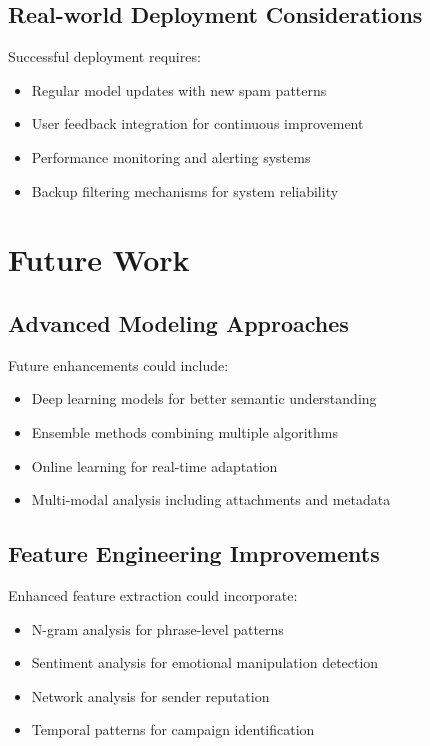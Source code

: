 \documentclass[12pt,a4paper]{article}
\begin{document}
\subsection{Real-world Deployment Considerations}

Successful deployment requires:
\begin{itemize}
    \item Regular model updates with new spam patterns
    \item User feedback integration for continuous improvement
    \item Performance monitoring and alerting systems
    \item Backup filtering mechanisms for system reliability
\end{itemize}

\section{Future Work}

\subsection{Advanced Modeling Approaches}

Future enhancements could include:
\begin{itemize}
    \item Deep learning models for better semantic understanding
    \item Ensemble methods combining multiple algorithms
    \item Online learning for real-time adaptation
    \item Multi-modal analysis including attachments and metadata
\end{itemize}

\subsection{Feature Engineering Improvements}

Enhanced feature extraction could incorporate:
\begin{itemize}
    \item N-gram analysis for phrase-level patterns
    \item Sentiment analysis for emotional manipulation detection
    \item Network analysis for sender reputation
    \item Temporal patterns for campaign identification
\end{itemize}
\end{document}

